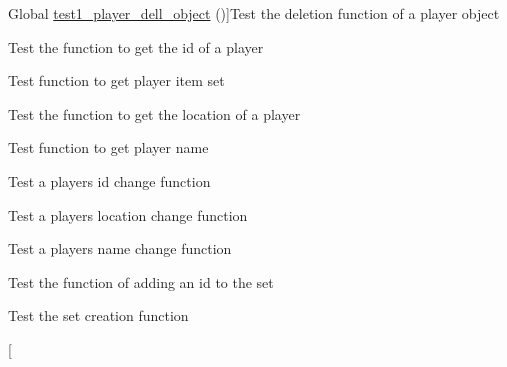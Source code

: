 \begin{DoxyRefList}
%
Global \hyperlink{player__test_8c_a5e2baa63ffa19a8676477e060ea784ca}{test1\+\_\+player\+\_\+dell\+\_\+object} ()]Test the deletion function of a player object  
\item[\label{test__test000134}%
\Hypertarget{test__test000134}%
Global \hyperlink{player__test_8c_a790a75dc179c00c60c784d3e34c0e5aa}{test1\+\_\+player\+\_\+get\+\_\+id} ()]Test the function to get the id of a player  
\item[\label{test__test000136}%
\Hypertarget{test__test000136}%
Global \hyperlink{player__test_8c_ad4a86b57bc18593265c205d7b27b9ecb}{test1\+\_\+player\+\_\+get\+\_\+inventory} ()]Test function to get player item set  
\item[\label{test__test000130}%
\Hypertarget{test__test000130}%
Global \hyperlink{player__test_8c_a408a557a0cff748c10fb9a03445af191}{test1\+\_\+player\+\_\+get\+\_\+location} ()]Test the function to get the location of a player  
\item[\label{test__test000126}%
\Hypertarget{test__test000126}%
Global \hyperlink{player__test_8c_a94068667d8faa66a4ad293dd2c60f2ef}{test1\+\_\+player\+\_\+get\+\_\+name} ()]Test function to get player name  
\item[\label{test__test000132}%
\Hypertarget{test__test000132}%
Global \hyperlink{player__test_8c_a64fa15a235953bea694236b9d7841cbc}{test1\+\_\+player\+\_\+set\+\_\+id} ()]Test a player\textquotesingle{}s id change function  
\item[\label{test__test000128}%
\Hypertarget{test__test000128}%
Global \hyperlink{player__test_8c_aec6799a4f46c3f3c471fcb668addcad4}{test1\+\_\+player\+\_\+set\+\_\+location} ()]Test a player\textquotesingle{}s location change function  
\item[\label{test__test000124}%
\Hypertarget{test__test000124}%
Global \hyperlink{player__test_8c_a9d87c09e6af910d695265e3fd77ae3a2}{test1\+\_\+player\+\_\+set\+\_\+name} ()]Test a player\textquotesingle{}s name change function  
\item[\label{test__test000140}%
\Hypertarget{test__test000140}%
Global \hyperlink{set__test_8c_a014ebe1b46af5ea318143fc61894d9c0}{test1\+\_\+set\+\_\+add} ()]Test the function of adding an id to the set  
\item[\label{test__test000138}%
\Hypertarget{test__test000138}%
Global \hyperlink{set__test_8c_a6f654ab4b44e8a9b9cedfb78c378a5d7}{test1\+\_\+set\+\_\+create} ()]Test the set creation function  
\item[\label{test__test000142}%
%

\end{DoxyRefList}
